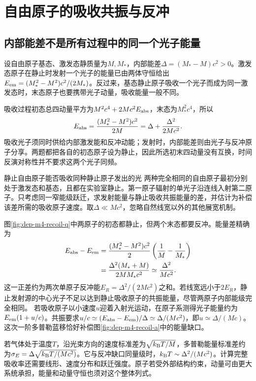 \section{自由原子的吸收共振与反冲}
\subsection{内部能差不是所有过程中的同一个光子能量}
设自由原子基态、激发态静质量为$M,M_*$，内部能差$\Delta=(M_*-M)c^2>0$。激发态原子在静止时发射一个光子的能量已由两体守恒给出$E_{\rm em}=(M_*^2-M^2)c^2/(2M_*)$。反过来，基态静止原子吸收一个光子而成为同一激发态时，末态原子也要携带光子动量，吸收能量一般不同。

吸收过程初态总四动量平方为$M^2c^4+2Mc^2E_{\rm abs}$，末态为$M_*^2c^4$，所以
\[
 E_{\rm abs}=\frac{(M_*^2-M^2)c^2}{2M}
 =\Delta+\frac{\Delta^2}{2Mc^2}.
\]
吸收光子须同时供给内部激发能和反冲动能；发射时，内部能差则由光子与反冲原子分享。两题都把各自的初态原子设为静止，因此所选初末四动量没有互换，时间反演对称性并不要求这两个光子同频。

\begin{example}静止自由原子能否吸收同种静止原子发出的光
两种完全相同的自由原子最初分别处于激发态和基态，且都在实验室静止。第一原子辐射的单光子沿连线入射第二原子。只考虑同一窄能级跃迁，求发射能量与静止吸收共振能量的差，并估计为补偿该差所需的吸收原子速度。取$\Delta\ll Mc^2$，忽略自然线宽以外的其他展宽机制。
\end{example}
\begin{solution}
图\ref{fig:dep-m4-recoil-q}中两原子的初态都静止，但两个末态都要反冲。能量差精确为
\begin{align*}
 E_{\rm abs}-E_{\rm em}
 &=\frac{(M_*^2-M^2)c^2}{2}
 \left(\frac1M-\frac1{M_*}\right)\\
 &=\frac{\Delta^2(M_*+M)}{2MM_*c^2}
 \simeq\frac{\Delta^2}{Mc^2}.
\end{align*}
这一正差约为两次单原子反冲能$E_R=\Delta^2/(2Mc^2)$之和。若线宽远小于$2E_R$，静止发射源的中心光子不足以达到静止吸收原子的共振能量，尽管两原子内部能级完全相同。
若吸收原子以小速度$u$迎着入射光运动，在原子系测得光子能量约为$E_{\rm em}(1+u/c)$。共振要求$u/c\simeq(E_{\rm abs}-E_{\rm em})/\Delta\simeq\Delta/(Mc^2)$，即$u\simeq\Delta/(Mc)$。这次一阶多普勒蓝移恰好补偿图\ref{fig:dep-m4-recoil-a}中的能量缺口。

若气体处于温度$T$，沿光束方向的速度标准差为$\sqrt{k_{\mathrm B} T/M}$，多普勒能量标准差约为$\sigma_E=\Delta\sqrt{k_{\mathrm B} T/(Mc^2)}$。它与反冲缺口同量级时，$k_{\mathrm B} T\sim\Delta^2/(Mc^2)$。计算完整吸收率还需要线形、速度分布和跃迁强度。原子若受外部结构约束，动量可由更大系统承担，能量和动量守恒也须对这个整体列式。
\end{solution}
